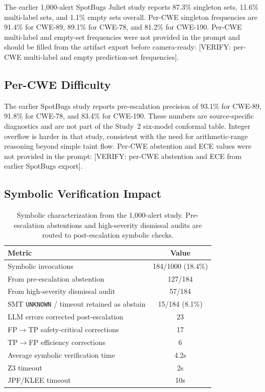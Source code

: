 The earlier 1,000-alert SpotBugs Juliet study reports 87.3\% singleton sets, 11.6\% multi-label sets, and 1.1\% empty sets overall. Per-CWE singleton frequencies are 91.4\% for CWE-89, 89.1\% for CWE-78, and 81.2\% for CWE-190. Per-CWE multi-label and empty-set frequencies were not provided in the prompt and should be filled from the artifact export before camera-ready: [VERIFY: per-CWE multi-label and empty prediction-set frequencies].

\subsection{Per-CWE Difficulty}

The earlier SpotBugs study reports pre-escalation precision of 93.1\% for CWE-89, 91.8\% for CWE-78, and 83.4\% for CWE-190. These numbers are source-specific diagnostics and are not part of the Study~2 six-model conformal table. Integer overflow is harder in that study, consistent with the need for arithmetic-range reasoning beyond simple taint flow. Per-CWE abstention and ECE values were not provided in the prompt: [VERIFY: per-CWE abstention and ECE from earlier SpotBugs export].

\subsection{Symbolic Verification Impact}

\begin{table}[h]
\centering
\caption{Symbolic characterization from the 1,000-alert study. Pre-escalation abstentions and high-severity dismissal audits are routed to post-escalation symbolic checks.}
\label{tab:symbolic_appendix}
\small
\begin{tabular}{lc}
\toprule
\textbf{Metric} & \textbf{Value} \\
\midrule
Symbolic invocations & 184/1000 (18.4\%) \\
From pre-escalation abstention & 127/184 \\
From high-severity dismissal audit & 57/184 \\
SMT \texttt{UNKNOWN} / timeout retained as abstain & 15/184 (8.1\%) \\
LLM errors corrected post-escalation & 23 \\
FP$\rightarrow$TP safety-critical corrections & 17 \\
TP$\rightarrow$FP efficiency corrections & 6 \\
Average symbolic verification time & 4.2s \\
Z3 timeout & 2s \\
JPF/KLEE timeout & 10s \\
\bottomrule
\end{tabular}
\end{table}

